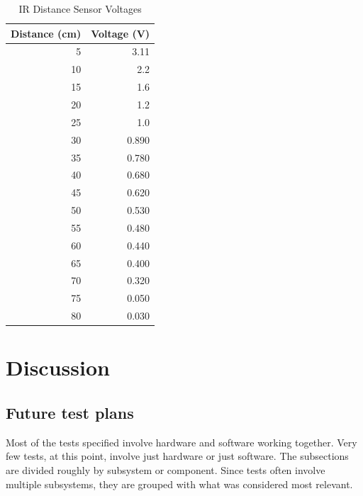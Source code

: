 \documentclass{article}
\begin{document}
	    
	    
        \begin{table}[!ht]
  	        \begin{center}
                \caption{IR Distance Sensor Voltages}
    		    \label{tab:table2}
    		    \begin{tabular}{r|r}
      			    \textbf{Distance (cm)} & \textbf{Voltage (V)} \\
			        \hline
      			    5 & 3.11\\
      			    10 & 2.2\\
      			    15 & 1.6\\
      			    20 & 1.2\\
				    25 & 1.0\\
				    30 & 0.890 \\
				    35 & 0.780 \\
				    40 & 0.680 \\
				    45 & 0.620 \\
				    50 & 0.530 \\
				    55 & 0.480 \\
				    60 & 0.440 \\
				    65 & 0.400 \\
				    70 & 0.320 \\
				    75 & 0.050 \\
				    80 & 0.030 \\
   			    \end{tabular}
  	        \end{center}
	    \end{table}
	
    \section{Discussion}
        \subsection{Future test plans}
	    Most of the tests specified involve hardware and software working together. Very few tests, at this point, involve just hardware or just software. The subsections are divided roughly by subsystem or component. Since tests often involve multiple subsystems, they are grouped with what was considered most relevant.
\end{document}
